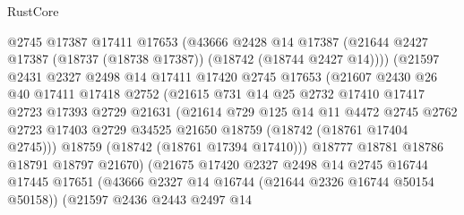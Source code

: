 \begin{lexlean}{RustCore}
\begin{coremodule}
                      @2745
                      @17387
                      @17411
                      @17653
                      (@43666
                        @2428
                        @14
                        @17387
                        (@21644 @2427 @17387 (@18737 (@18738 @17387)) (@18742 (@18744 @2427 @14))))
                      (@21597
                        @2431
                        @2327
                        @2498
                        @14
                        @17411
                        @17420
                        @2745
                        @17653
                        (@21607
                          @2430
                          @26
                          @40
                          @17411
                          @17418
                          @2752
                          (@21615
                            @731
                            @14
                            @25
                            @2732
                            @17410
                            @17417
                            @2723
                            @17393
                            @2729
                            @21631
                            (@21614
                              @729
                              @125
                              @14
                              @11
                              @4472
                              @2745
                              @2762
                              @2723
                              @17403
                              @2729
                              @34525
                              @21650
                              @18759
                              (@18742 (@18761 @17404 @2745)))
                            @18759
                            (@18742 (@18761 @17394 @17410)))
                          @18777
                          @18781
                          @18786
                          @18791
                          @18797
                          @21670)
                        (@21675
                          @17420
                          @2327
                          @2498
                          @14
                          @2745
                          @16744
                          @17445
                          @17651
                          (@43666 @2327 @14 @16744 (@21644 @2326 @16744 @50154 @50158))
                          (@21597
                            @2436
                            @2443
                            @2497
                            @14

\end{coremodule}
\end{lexlean}
